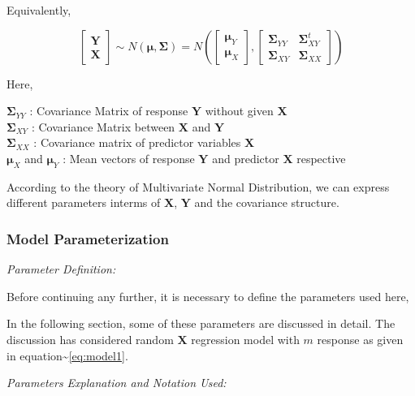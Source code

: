 \documentclass[12pt,A4paper,authoryear]{elsarticle} %
\begin{document}
Equivalently,

\begin{equation}
  \begin{bmatrix}\mathbf{Y}\\ \mathbf{X}\end{bmatrix} \sim N(\boldsymbol{\mu}, \boldsymbol{\Sigma})
  = N \left(
    \begin{bmatrix}
      \boldsymbol{\mu}_Y \\
      \boldsymbol{\mu}_X
    \end{bmatrix},
    \begin{bmatrix}
      \boldsymbol{\Sigma}_{YY} & \boldsymbol{\Sigma}_{XY}^t \\
      \boldsymbol{\Sigma}_{XY} & \boldsymbol{\Sigma}_{XX}
    \end{bmatrix}
  \right)
  \label{eq:model2}
\end{equation}

Here,

\(\boldsymbol{\Sigma}_{YY}\) : Covariance Matrix of response
\(\mathbf{Y}\) without given \(\mathbf{X}\)\\
\(\boldsymbol{\Sigma}_{XY}\) : Covariance Matrix between \(\mathbf{X}\)
and \(\mathbf{Y}\)\\
\(\boldsymbol{\Sigma}_{XX}\) : Covariance matrix of predictor variables
\(\mathbf{X}\)\\
\(\boldsymbol{\mu}_X\) and \(\boldsymbol{\mu}_Y\) : Mean vectors of
response \(\mathbf{Y}\) and predictor \(\mathbf{X}\) respective

According to the theory of Multivariate Normal Distribution, we can
express different parameters interms of \(\mathbf{X}\), \(\mathbf{Y}\)
and the covariance structure.

\subsubsection{Model Parameterization}\label{model-parameterization}

\emph{Parameter Definition:}

Before continuing any further, it is necessary to define the parameters
used here,

In the following section, some of these parameters are discussed in
detail. The discussion has considered random \(\mathbf{X}\) regression
model with \(m\) response as given in
equation\textasciitilde{}\eqref{eq:model1}.

\emph{Parameters Explanation and Notation Used:}
\end{document}
